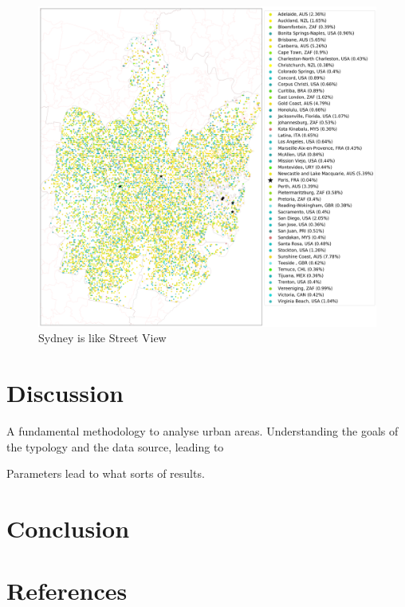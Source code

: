 \documentclass[final,3p,times,authoryear]{elsarticle}
\begin{document}
\begin{figure}[!htbp]
\includegraphics[scale=0.25]{Images/SydneyOverallAbrev_street.png}  
\caption{Sydney is like Street View}    
 \label{fig:sydmaps}  
\end{figure} 




\section{Discussion}\label{sec:discussion}

A fundamental methodology to analyse urban areas. Understanding the goals of the typology and the data source, leading to 

Parameters lead to what sorts of results.

\section{Conclusion}\label{sec:conclusion}


\section*{References}\label{sec:ref}
   
  
\end{document}
